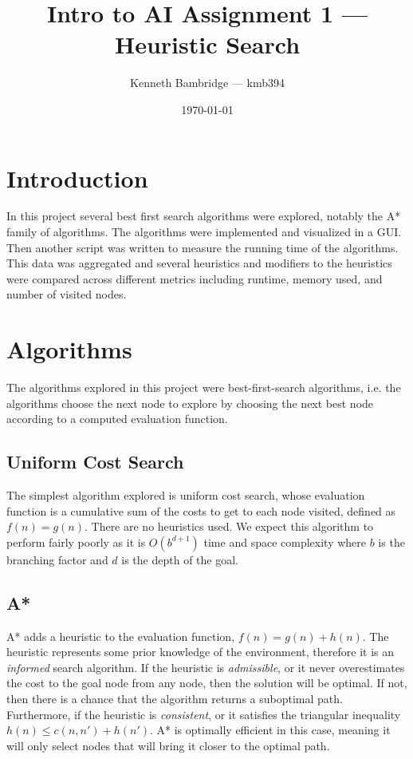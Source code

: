 \documentclass[11pt,letter]{article}
\begin{document}
\title{Intro to AI Assignment 1 --- Heuristic Search}
\author{Kenneth Bambridge --- kmb394}
\date{\today}
\maketitle
\tableofcontents

\section{Introduction}
In this project several best first search algorithms were explored, notably the A* family of algorithms. The algorithms were implemented and visualized in a GUI. Then another script was written to measure the running time of the algorithms. This data was aggregated and several heuristics and modifiers to the heuristics were compared across different metrics including runtime, memory used, and number of visited nodes.

\section{Algorithms}
The algorithms explored in this project were best-first-search algorithms, i.e. the algorithms choose the next node to explore by choosing the next best node according to a computed evaluation function.

\subsection{Uniform Cost Search}
The simplest algorithm explored is uniform cost search, whose evaluation function is a cumulative sum of the costs to get to each node visited, defined as $f(n) = g(n)$. There are no heuristics used. We expect this algorithm to perform fairly poorly as it is $O(b^{d+1})$ time and space complexity where $b$ is the branching factor and $d$ is the depth of the goal.

\subsection{A*}
A* adds a heuristic to the evaluation function, $f(n) = g(n) + h(n)$. The heuristic represents some prior knowledge of the environment, therefore it is an \textit{informed} search algorithm.
If the heuristic is \textit{admissible}, or it never overestimates the cost to the goal node from any node, then the solution will be optimal. If not, then there is a chance that the algorithm returns a suboptimal path. Furthermore, if the heuristic is \textit{consistent}, or it satisfies the triangular inequality $h(n) \leq c(n, n') + h(n')$. A* is optimally efficient in this case, meaning it will only select nodes that will bring it closer to the optimal path.
\end{document}
